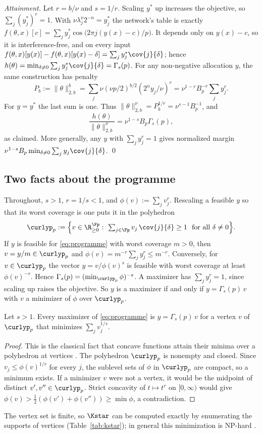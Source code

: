 \emph{Attainment.} Let $r=b/\nu$ and $s=1/r$. Scaling $y^*$ up increases the objective, so $\sum_j(y^*_j)^r=1$. With $\nu\lambda_j^\nu2^{-n}=y^*_j$ the network's table is exactly
$f(\theta,x)[c]=\sum_jy^*_j\cos\big(2\pi j(y(x)-c)/p\big)$. It depends only on $y(x)-c$, so it is interference-free, and on every input $f(\theta,x)[y(x)]-f(\theta,x)[y(x)-\delta]=\sum_jy^*_j\cov{j}{\delta}$; hence $h(\theta)=\min_{\delta\neq0}\sum_jy^*_j\cov{j}{\delta}=\Gamma_s(p)$. For any non-negative allocation $y$, the same construction has penalty
\[
P_b:=\|\theta\|_{2,b}^b
=\sum_j\nu(\nu p/2)^{b/2}(2^ny_j/\nu)^r
=\nu^{1-r}B_p^{-r}\sum_jy_j^r.
\]
For $y=y^*$ the last sum is one. Thus $\|\theta\|_{2,b}^\nu=P_b^{1/r}=\nu^{s-1}B_p^{-1}$, and
\[
\frac{h(\theta)}{\|\theta\|_{2,b}^\nu}
=\nu^{1-s}B_p\Gamma_s(p),
\]
as claimed. More generally, any $y$ with $\sum_jy_j^r=1$ gives normalized margin $\nu^{1-s}B_p\min_{\delta\neq0}\sum_jy_j\cov{j}{\delta}$.
\qed

\subsection{Two facts about the programme}\label{app:shape}

Throughout, $s>1$, $r=1/s<1$, and $\phi(v):=\sum_jv_j^r$. Rescaling a feasible $y$ so that its worst coverage is one puts it in the polyhedron
\[
\curlyp_p:=\Big\{v\in\R_{\ge0}^{\Fp}:\ \textstyle\sum_{j\in\Fp}v_j\,\cov{j}{\delta}\ge1\ \text{ for all }\delta\neq0\Big\}.
\]
If $y$ is feasible for \eqref{eq:programme} with worst coverage $m>0$, then $v=y/m\in\curlyp_p$ and $\phi(v)=m^{-r}\sum_jy_j^r\le m^{-r}$. Conversely, for $v\in\curlyp_p$ the vector $y=v/\phi(v)^s$ is feasible with worst coverage at least $\phi(v)^{-s}$. Hence $\Gamma_s(p)=(\min_{\curlyp_p}\phi)^{-s}$. A maximizer has $\sum_jy_j^r=1$, since scaling up raises the objective. So $y$ is a maximizer if and only if $y=\Gamma_s(p)\,v$ with $v$ a minimizer of $\phi$ over $\curlyp_p$.

\begin{lemma}\label{lem:vertex}
Let $s>1$. Every maximizer of \eqref{eq:programme} is $y=\Gamma_s(p)\,v$ for a vertex $v$ of $\curlyp_p$ that minimizes $\sum_jv_j^{1/s}$.
\end{lemma}
\begin{proof}
This is the classical fact that concave functions attain their minima over a polyhedron at vertices \citep[\S32]{hirsch1961extreme,rockafellar1970convex}. The polyhedron $\curlyp_p$ is nonempty and closed. Since $v_j\le\phi(v)^{1/r}$ for every $j$, the sublevel sets of $\phi$ in $\curlyp_p$ are compact, so a minimum exists. If a minimizer $v$ were not a vertex, it would be the midpoint of distinct $v',v''\in\curlyp_p$. Strict concavity of $t\mapsto t^r$ on $[0,\infty)$ would give $\phi(v)>\frac12(\phi(v')+\phi(v''))\ge\min\phi$, a contradiction.
\end{proof}
The vertex set is finite, so $\Kstar$ can be computed exactly by enumerating the supports of vertices (Table~\ref{tab:kstar}); in general this minimization is NP-hard \citep{ge2011note}.

